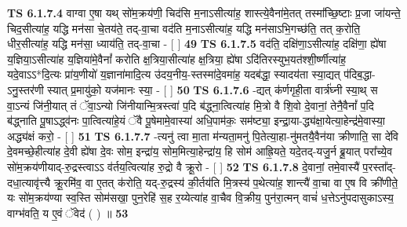 \documentclass[17pt]{extarticle}
\begin{document}
                  \newline
                                \textbf{ TS 6.1.7.4} \newline
                  वाग्वा ए॒षा यथ् सो॑म॒क्रय॑णी॒ चिद॑सि म॒नाऽसीत्या॑ह॒ शास्त्ये॒वैना॑मे॒तत् तस्मा᳚च्छि॒ष्टाः प्र॒जा जा॑यन्ते॒ चिद॒सीत्या॑ह॒ यद्धि मन॑सा चे॒तय॑ते॒ तद्-वा॒चा वद॑ति म॒नाऽसीत्या॑ह॒ यद्धि मन॑साऽभि॒गच्छ॑ति॒ तत् क॒रोति॒ धीर॒सीत्या॑ह॒ यद्धि मन॑सा॒ ध्याय॑ति॒ तद्-वा॒चा - [  ] \textbf{  49} \newline
                  \newline
                                \textbf{ TS 6.1.7.5} \newline
                  वद॑ति॒ दक्षि॑णा॒ऽसीत्या॑ह॒ दक्षि॑णा॒ ह्ये॑षा य॒ज्ञिया॒ऽसीत्या॑ह य॒ज्ञिया॑मे॒वैनां᳚ करोति क्ष॒त्रिया॒सीत्या॑ह क्ष॒त्रिया॒ ह्ये॑षा ऽदि॑तिरस्युभ॒यत॑श्शी॒र्ष्णीत्या॑ह॒ यदे॒वाऽऽ*दि॒त्यः प्रा॑य॒णीयो॑ य॒ज्ञाना॑मादि॒त्य उ॑दय॒नीय॒-स्तस्मा॑दे॒वमा॑ह॒ यदब॑द्धा॒ स्यादय॑ता स्या॒द्यत् प॑दिब॒द्धा-ऽनु॒स्तर॑णी स्यात् प्र॒मायु॑को॒ यज॑मानः स्या॒ - [  ] \textbf{  50} \newline
                  \newline
                                \textbf{ TS 6.1.7.6} \newline
                  -द्यत् क॑र्णगृही॒ता वार्त्र॑घ्नी स्या॒थ् स वा॒ऽन्यं जि॑नी॒यात् तं ॅवा॒ऽन्यो जि॑नीयान्मि॒त्रस्त्वा॑ प॒दि ब॑द्ध्ना॒त्वित्या॑ह मि॒त्रो वै शि॒वो दे॒वानां॒ तेनै॒वैनां᳚ प॒दि ब॑द्ध्नाति पू॒षाऽद्ध्व॑नः पा॒त्वित्या॑हे॒यं ॅवै पू॒षेमामे॒वास्या॑ अधि॒पाम॑कः॒ सम॑ष्ट्या॒ इन्द्रा॒या-द्ध्य॑क्षा॒येत्या॒हेन्द्र॑मे॒वास्या॒ अद्ध्य॑क्षं करो॒ - [  ] \textbf{  51} \newline
                  \newline
                                \textbf{ TS 6.1.7.7} \newline
                  -त्यनु॑ त्वा मा॒ता म॑न्यता॒मनु॑ पि॒तेत्या॒हा-नु॑मतयै॒वैन॑या क्रीणाति॒ सा दे॑वि दे॒वमच्छे॒हीत्या॑ह दे॒वी ह्ये॑षा दे॒वः सोम॒ इन्द्रा॑य॒ सोम॒मित्या॒हेन्द्रा॑य॒ हि सोम॑ आह्रि॒यते॒ यदे॒तद्-यजु॒र्न ब्रू॒यात् परा᳚च्ये॒व सो॑म॒क्रय॑णीयाद्-रु॒द्रस्त्वाऽऽ व॑र्तय॒त्वित्या॑ह रु॒द्रो वै क्रू॒रो - [  ] \textbf{  52} \newline
                  \newline
                                \textbf{ TS 6.1.7.8} \newline
                  दे॒वानां॒ तमे॒वास्यै॑ प॒रस्ता᳚द्-दधा॒त्यावृ॑त्त्यै क्रू॒रमि॑व॒ वा ए॒तत् क॑रोति॒ यद्-रु॒द्रस्य॑ की॒र्तय॑ति मि॒त्रस्य॑ प॒थेत्या॑ह॒ शान्त्यै॑ वा॒चा वा ए॒ष वि क्री॑णीते॒ यः सो॑म॒क्रय॑ण्या स्व॒स्ति सोम॑सखा॒ पुन॒रेहि॑ स॒ह र॒य्येत्या॑ह वा॒चैव वि॒क्रीय॒ पुन॑रा॒त्मन् वाचं॑ ध॒त्तेऽनु॑पदासुकाऽस्य॒ वाग्भ॑वति॒ य ए॒वं ॅवेद॑ ( ) ॥ \textbf{  53 } \newline
\end{document}
